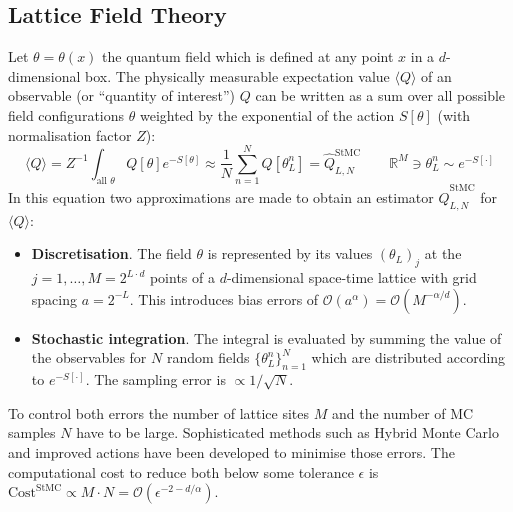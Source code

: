 \documentclass[11pt]{article}
\begin{document}
\subsection{Lattice Field Theory}
Let $\theta=\theta(x)$ the quantum field which is defined at any point $x$ in a $d$-dimensional box. The physically measurable expectation value $\langle Q\rangle$ of an observable (or ``quantity of interest'') $Q$ can be written as a sum over all possible field configurations $\theta$ weighted by the exponential of the action $S[\theta]$ (with normalisation factor $Z$):
\begin{equation}
  \langle Q\rangle = Z^{-1} \int_{\text{all $\theta$}} Q[\theta]e^{-S[\theta]} \approx \frac{1}{N} \sum_{n=1}^N Q[\theta_L^n] = \hat{Q}^{\text{StMC}}_{L,N} \qquad \mathbb{R}^{M}\ni \theta_L^n\sim e^{-S[\cdot]}
\end{equation}
In this equation two approximations are made to obtain an estimator $\hat{Q}^{\text{StMC}}_{L,N}$ for $\langle Q\rangle$:
\begin{itemize}
    \item \textbf{Discretisation}. The field $\theta$ is represented by its values $(\theta_L)_j$ at the $j=1,\dots,M=2^{L\cdot d}$ points of a $d$-dimensional space-time lattice with grid spacing $a=2^{-L}$. This introduces bias errors of $\mathcal{O}(a^\alpha)=\mathcal{O}(M^{-\alpha/d})$.
    \item \textbf{Stochastic integration}. The integral is evaluated by summing the value of the observables for $N$ random fields $\{\theta_L^n\}_{n=1}^N$ which are distributed according to $e^{-S[\cdot ]}$. The sampling error is $\propto{1/\sqrt{N}}$.
\end{itemize}
To control both errors the number of lattice sites $M$ and the number of MC samples $N$ have to be large. Sophisticated methods such as Hybrid Monte Carlo \cite{Duane1987} and improved actions \cite{Davies2004} have been developed to minimise those errors. The computational cost to reduce both below some tolerance $\epsilon$ is $\text{Cost}^{\text{StMC}}\propto M\cdot N=\mathcal{O}(\epsilon^{-2-d/\alpha})$.
\end{document}
